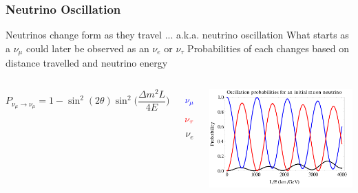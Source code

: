 \documentclass[10pt,professionalfonts,xcolor=table]{beamer}
\begin{document}
\begin{frame}
\end{frame}

\frame
{
  \frametitle{Neutrino Oscillation}
  \bangon
  \bang Neutrinos change form as they travel
	  \bangon
	  \bing ... a.k.a. neutrino oscillation
	  \bing What starts as a $\nu_\mu$ could later be observed as an $\nu_e$ or $\nu_\tau$
	  \bing Probabilities of each changes based on distance travelled and neutrino energy
	  \bangoff
  \bangoff
\gap
\begin{columns}[c]
\begin{equation*}
P_{\nu_\mu \rightarrow \nu_\mu} = 1 - \sin^2(2\theta) \sin^2\bigg(\frac{\Delta m^2 L}{4 E}\bigg)
\end{equation*}
\gap
{}
\vspace{-70pt}

\begin{equation*}
\color{blue}
\nu_\mu
\end{equation*}
\vspace{-20pt}
\begin{equation*}
\color{red}
\nu_\tau
\end{equation*}
\vspace{-20pt}
\begin{equation*}
\nu_e
\end{equation*}
\gap

\includegraphics[width=1\textwidth]{figures/figures/osc_prob.png}

\end{columns}


}
\end{document}
